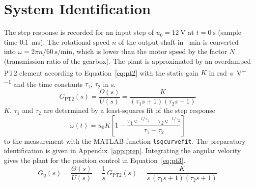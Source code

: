 \section{System Identification}\label{sec:identification}
The step response is recorded for an input step of $u_0 = \qty{12}{\volt}$ at
$t = \qty{0}{\second}$ (sample time \qty{0.1}{\milli\second}).\autocite{laboranleitung}
The rotational speed $n$ of the output shaft in \unit{\per\minute} is converted
into $\omega = 2\pi n / \qty{60}{\second\per\minute}$, which is lower than the
motor speed by the factor $N$ (transmission ratio of the gearbox). The plant is approximated by an overdamped PT2
element according to Equation~\eqref{eq:pt2} with the static gain $K$ in
\unit{\radian\per\second\per\volt} and the time constants $\tau_1$, $\tau_2$ in
\unit{\second}.
\begin{equation}
  G_\mathrm{PT2}(s) = \frac{\Omega(s)}{U(s)}
  = \frac{K}{(\tau_1 s + 1)(\tau_2 s + 1)}
  \label{eq:pt2}
\end{equation}
$K$, $\tau_1$ and $\tau_2$ are determined by a least-squares fit of the step
response
\begin{equation*}
  \omega(t) = u_0 K \left[ 1 - \frac{\tau_1\,\mathrm{e}^{-t/\tau_1}
  - \tau_2\,\mathrm{e}^{-t/\tau_2}}{\tau_1 - \tau_2} \right]
\end{equation*}
to the measurement with the MATLAB function \texttt{lsqcurvefit}. The preparatory
identification is given in Appendix~\ref{app:prep}. Integrating
the angular velocity gives the plant for the position control in
Equation~\eqref{eq:pt3}\autocite{laboranleitung}.
\begin{equation}
  G_\mathrm{p}(s) = \frac{\Theta(s)}{U(s)} = \frac{1}{s}\,G_\mathrm{PT2}(s)
  = \frac{K}{s\,(\tau_1 s + 1)(\tau_2 s + 1)}
  \label{eq:pt3}
\end{equation}

